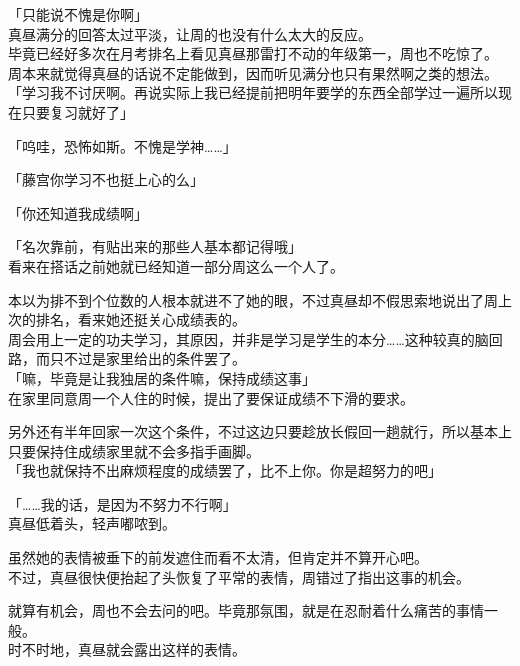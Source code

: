 「只能说不愧是你啊」\\

真昼满分的回答太过平淡，让周的也没有什么太大的反应。\\

毕竟已经好多次在月考排名上看见真昼那雷打不动的年级第一，周也不吃惊了。\\

周本来就觉得真昼的话说不定能做到，因而听见满分也只有果然啊之类的想法。\\

「学习我不讨厌啊。再说实际上我已经提前把明年要学的东西全部学过一遍所以现在只要复习就好了」

「呜哇，恐怖如斯。不愧是学神……」

「藤宫你学习不也挺上心的么」

「你还知道我成绩啊」

「名次靠前，有贴出来的那些人基本都记得哦」\\

看来在搭话之前她就已经知道一部分周这么一个人了。

本以为排不到个位数的人根本就进不了她的眼，不过真昼却不假思索地说出了周上次的排名，看来她还挺关心成绩表的。\\

周会用上一定的功夫学习，其原因，并非是学习是学生的本分……这种较真的脑回路，而只不过是家里给出的条件罢了。\\

「嘛，毕竟是让我独居的条件嘛，保持成绩这事」\\

在家里同意周一个人住的时候，提出了要保证成绩不下滑的要求。

另外还有半年回家一次这个条件，不过这边只要趁放长假回一趟就行，所以基本上只要保持住成绩家里就不会多指手画脚。\\

「我也就保持不出麻烦程度的成绩罢了，比不上你。你是超努力的吧」

「……我的话，是因为不努力不行啊」\\

真昼低着头，轻声嘟哝到。

虽然她的表情被垂下的前发遮住而看不太清，但肯定并不算开心吧。\\

不过，真昼很快便抬起了头恢复了平常的表情，周错过了指出这事的机会。

就算有机会，周也不会去问的吧。毕竟那氛围，就是在忍耐着什么痛苦的事情一般。\\

时不时地，真昼就会露出这样的表情。

